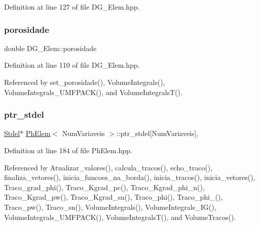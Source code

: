 Definition at line 127 of file D\+G\+\_\+\+Elem.\+hpp.

\mbox{\label{classDG__Elem_a0bb64698c7f238bf48da2d584965fcd0}} 
\subsubsection{\texorpdfstring{porosidade}{porosidade}}
{\footnotesize\ttfamily double D\+G\+\_\+\+Elem\+::porosidade\hspace{0.3cm}{\ttfamily [private]}}



Definition at line 110 of file D\+G\+\_\+\+Elem.\+hpp.



Referenced by set\+\_\+porosidade(), Volume\+Integrals(), Volume\+Integrals\+\_\+\+U\+M\+F\+P\+A\+C\+K(), and Volume\+Integrals\+T().

\mbox{\label{classPhElem_a7b4509b90bcf92be76cd8fdb76d7385b}} 
\subsubsection{\texorpdfstring{ptr\+\_\+stdel}{ptr\_stdel}}
{\footnotesize\ttfamily \hyperlink{classStdel}{Stdel}$\ast$ \hyperlink{classPhElem}{Ph\+Elem}$<$ Num\+Variaveis $>$\+::ptr\+\_\+stdel\mbox{[}Num\+Variaveis\mbox{]}\hspace{0.3cm}{\ttfamily [protected]}, {\ttfamily [inherited]}}



Definition at line 184 of file Ph\+Elem.\+hpp.



Referenced by Atualizar\+\_\+valores(), calcula\+\_\+tracos(), echo\+\_\+traco(), finaliza\+\_\+vetores(), inicia\+\_\+funcoes\+\_\+na\+\_\+borda(), inicia\+\_\+tracos(), inicia\+\_\+vetores(), Traco\+\_\+grad\+\_\+phi(), Traco\+\_\+\+Kgrad\+\_\+pc(), Traco\+\_\+\+Kgrad\+\_\+phi\+\_\+n(), Traco\+\_\+\+Kgrad\+\_\+pw(), Traco\+\_\+\+Kgrad\+\_\+sn(), Traco\+\_\+phi(), Traco\+\_\+phi\+\_(), Traco\+\_\+pw(), Traco\+\_\+sn(), Volume\+Integrals(), Volume\+Integrals\+\_\+\+I\+G(), Volume\+Integrals\+\_\+\+U\+M\+F\+P\+A\+C\+K(), Volume\+Integrals\+T(), and Volume\+Tracos().

